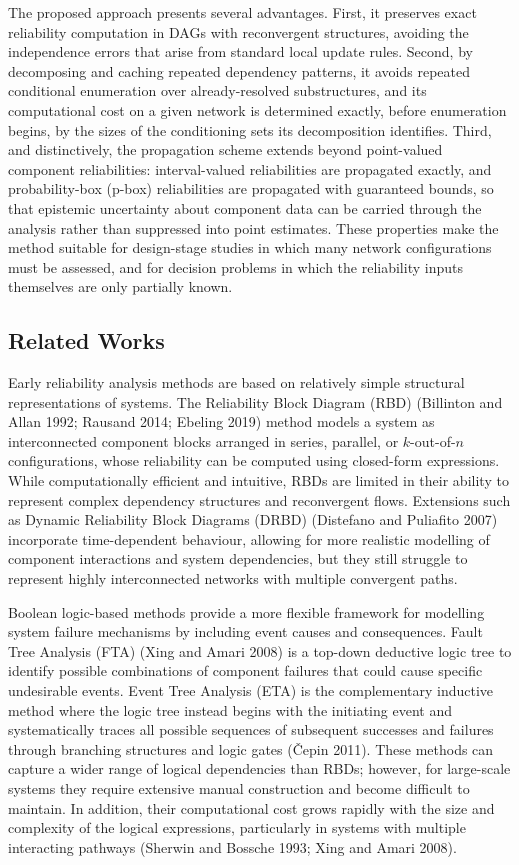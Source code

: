 \documentclass[preprint,12pt]{elsarticle}
\theoremstyle{definition}
\begin{document}
The proposed approach presents several advantages. First, it preserves exact reliability computation in
DAGs with reconvergent structures, avoiding the independence errors that arise from standard local update
rules. Second, by decomposing and caching repeated dependency patterns, it avoids repeated conditional
enumeration over already-resolved substructures, and its computational cost on a given network is
determined exactly, before enumeration begins, by the sizes of the conditioning sets its decomposition
identifies. Third, and distinctively, the propagation scheme extends beyond point-valued component
reliabilities: interval-valued reliabilities are propagated exactly, and probability-box (p-box)
reliabilities are propagated with guaranteed bounds, so that epistemic uncertainty about component data
can be carried through the analysis rather than suppressed into point estimates. These properties make
the method suitable for design-stage studies in which many network configurations must be assessed, and
for decision problems in which the reliability inputs themselves are only partially known.

\subsection{Related Works}\label{sec:related}

Early reliability analysis methods are based on relatively simple structural representations of systems.
The Reliability Block Diagram (RBD) (Billinton and Allan 1992; Rausand 2014; Ebeling 2019) method models
a system as interconnected component blocks arranged in series, parallel, or $k$-out-of-$n$
configurations, whose reliability can be computed using closed-form expressions. While computationally
efficient and intuitive, RBDs are limited in their ability to represent complex dependency structures and
reconvergent flows. Extensions such as Dynamic Reliability Block Diagrams (DRBD) (Distefano and Puliafito
2007) incorporate time-dependent behaviour, allowing for more realistic modelling of component
interactions and system dependencies, but they still struggle to represent highly interconnected networks
with multiple convergent paths.

Boolean logic-based methods provide a more flexible framework for modelling system failure mechanisms by
including event causes and consequences. Fault Tree Analysis (FTA) (Xing and Amari 2008) is a top-down
deductive logic tree to identify possible combinations of component failures that could cause specific
undesirable events. Event Tree Analysis (ETA) is the complementary inductive method where the logic tree
instead begins with the initiating event and systematically traces all possible sequences of subsequent
successes and failures through branching structures and logic gates (\v{C}epin 2011). These methods can
capture a wider range of logical dependencies than RBDs; however, for large-scale systems they require
extensive manual construction and become difficult to maintain. In addition, their computational cost
grows rapidly with the size and complexity of the logical expressions, particularly in systems with
multiple interacting pathways (Sherwin and Bossche 1993; Xing and Amari 2008).
\end{document}
